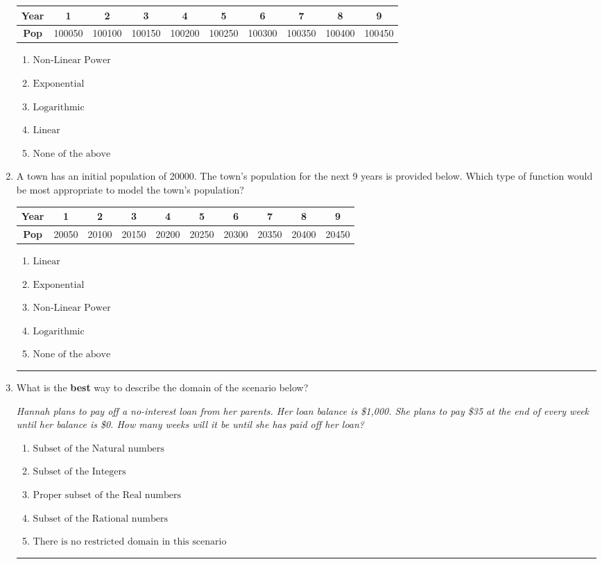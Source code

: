 \documentclass[14pt]{extbook}
\newcommand{\litem}[1]{\item#1\hspace*{-1cm}\rule{\textwidth}{0.4pt}}
\begin{document}
\begin{enumerate}
{\begin{tabular}{c|c|c|c|c|c|c|c|c|c}
\textbf{Year} &1 &2 &3 &4 &5 &6 &7 &8 &9\tabularnewline \hline
\textbf{Pop} &100050 &100100 &100150 &100200 &100250 &100300 &100350 &100400 &100450\end{tabular}\begin{enumerate}[label=\Alph*.]
\item \( \text{Non-Linear Power} \)
\item \( \text{Exponential} \)
\item \( \text{Logarithmic} \)
\item \( \text{Linear} \)
\item \( \text{None of the above} \)

\end{enumerate} }
\litem{
A town has an initial population of 20000. The town's population for the next 9 years is provided below. Which type of function would be most appropriate to model the town's population?

\begin{tabular}{c|c|c|c|c|c|c|c|c|c}
\textbf{Year} &1 &2 &3 &4 &5 &6 &7 &8 &9\tabularnewline \hline
\textbf{Pop} &20050 &20100 &20150 &20200 &20250 &20300 &20350 &20400 &20450\end{tabular}\begin{enumerate}[label=\Alph*.]
\item \( \text{Linear} \)
\item \( \text{Exponential} \)
\item \( \text{Non-Linear Power} \)
\item \( \text{Logarithmic} \)
\item \( \text{None of the above} \)

\end{enumerate} }
\litem{
What is the \textbf{best} way to describe the domain of the scenario below?
\begin{center}
    \textit{ Hannah plans to pay off a no-interest loan from her parents. Her loan balance is \$1,000. She plans to pay \$35 at the end of every week until her balance is \$0. How many weeks will it be until she has paid off her loan? }
\end{center}
\begin{enumerate}[label=\Alph*.]
\item \( \text{Subset of the Natural numbers} \)
\item \( \text{Subset of the Integers} \)
\item \( \text{Proper subset of the Real numbers} \)
\item \( \text{Subset of the Rational numbers} \)
\item \( \text{There is no restricted domain in this scenario} \)


\end{enumerate}}
\end{enumerate}
\end{document}
